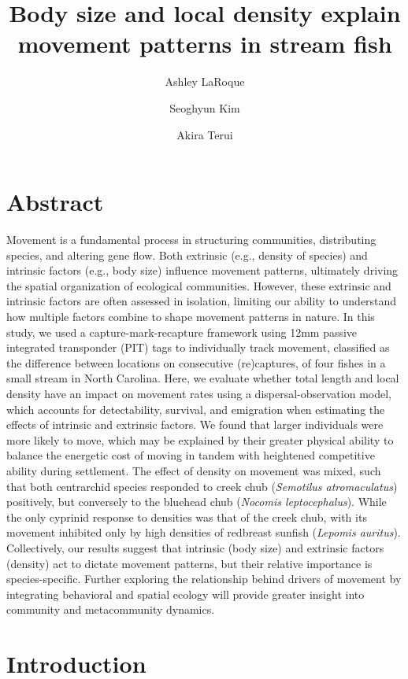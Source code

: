 \documentclass[11pt, class=article, crop=false]{standalone}
\title{Body size and local density explain movement patterns in stream fish}
\date{} %
\author[1]{Ashley LaRoque}
\author[2]{Seoghyun Kim}
\author[1]{Akira Terui}
\affil[1]{Depatment of Biology, University of North Carolina at Greensboro}
\affil[2]{Department of Biological Sciences, Kangwon National University}
\begin{document}
\maketitle

\section{Abstract}

Movement is a fundamental process in structuring communities, distributing species, and altering gene flow. Both extrinsic (e.g., density of species) and intrinsic factors (e.g., body size) influence movement patterns, ultimately driving the spatial organization of ecological communities. However, these extrinsic and intrinsic factors are often assessed in isolation, limiting our ability to understand how multiple factors combine to shape movement patterns in nature. In this study, we used a capture-mark-recapture framework using 12mm passive integrated transponder (PIT) tags to individually track movement, classified as the difference between locations on consecutive (re)captures, of four fishes in a small stream in North Carolina. Here, we evaluate whether total length and local density have an impact on movement rates using a dispersal-observation model, which accounts for detectability, survival, and emigration when estimating the effects of intrinsic and extrinsic factors. We found that larger individuals were more likely to move, which may be explained by their greater physical ability to balance the energetic cost of moving in tandem with heightened competitive ability during settlement. The effect of density on movement was mixed, such that both centrarchid species responded to creek chub (\textit{Semotilus atromaculatus}) positively, but conversely to the bluehead chub (\textit{Nocomis leptocephalus}). While the only cyprinid response to densities was that of the creek chub, with its movement inhibited only by high densities of redbreast sunfish (\textit{Lepomis auritus}). Collectively, our results suggest that intrinsic (body size) and extrinsic factors (density) act to dictate movement patterns, but their relative importance is species-specific. Further exploring the relationship behind drivers of movement by integrating behavioral and spatial ecology will provide greater insight into community and metacommunity dynamics. 

\section{Introduction}
\end{document}
